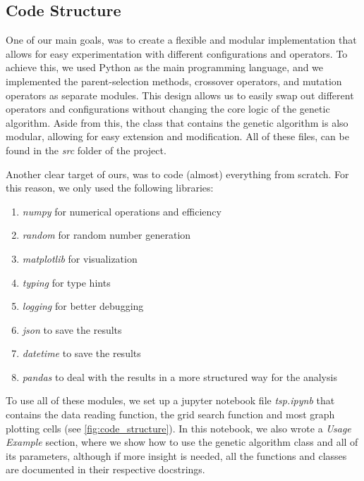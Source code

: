 \documentclass[12pt]{article}
\begin{document}
\begin{enumerate}
\subsection{Code Structure}
One of our main goals, was to create a flexible and modular implementation that allows for easy experimentation with different configurations and operators. To achieve this, we used Python as the main programming language, and we implemented the parent-selection methods, crossover operators, and mutation operators as separate modules. This design allows us to easily swap out different operators and configurations without changing the core logic of the genetic algorithm. Aside from this, the class that contains the genetic algorithm is also modular, allowing for easy extension and modification. All of these files, can be found in the \textit{src} folder of the project.

Another clear target of ours, was to code (almost) everything from scratch. For this reason, we only used the following libraries:
\begin{enumerate}
    \item \textit{numpy} for numerical operations and efficiency
    \item \textit{random} for random number generation
    \item \textit{matplotlib} for visualization
    \item \textit{typing} for type hints
    \item \textit{logging} for better debugging
    \item \textit{json} to save the results
    \item \textit{datetime} to save the results
    \item \textit{pandas} to deal with the results in a more structured way for the analysis
\end{enumerate}

To use all of these modules, we set up a jupyter notebook file \textit{tsp.ipynb} that contains the data reading function, the grid search function and most graph plotting cells (see \ref{fig:code_structure}). In this notebook, we also wrote a \textit{Usage Example} section, where we show how to use the genetic algorithm class and all of its parameters, although if more insight is needed, all the functions and classes are documented in their respective docstrings.

\begin{figure}
    \centering
\end{figure}
\end{enumerate}
\end{document}
